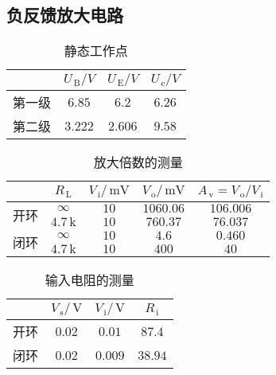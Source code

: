 \documentclass{ctexart}
\renewcommand{\rm}{\,\mathrm}
\begin{document}
    \subsection{负反馈放大电路}
    \begin{table}[htbp]
    	\centering
    	\caption{静态工作点}
    	\begin{tabular}{|l|c|c|c|}
    		\hline
    		& \multicolumn{1}{c|}{$U_{\rm{B}}/V$} & \multicolumn{1}{c|}{$U_{\rm{E}}/V$} & \multicolumn{1}{c|}{$U_{\rm{c}}/V$} \\
    		\hline
    		第一级   & $6.85$  & $6.2$   & $6.26$ \\
    		\hline
    		第二级   & $3.222$ & $2.606$ & $9.58$ \\
    		\hline
    	\end{tabular}%
    \end{table}%
    \begin{table}[htbp]
    	\centering
    	\caption{放大倍数的测量}
    	\begin{tabular}{|c|c|c|c|c|}
    		\hline
    		& \multicolumn{1}{c|}{$R_{\rm{L}}$} & \multicolumn{1}{c|}{$V_{\rm{i}}/\rm{mV}$} & \multicolumn{1}{c|}{$V_{\rm{o}}/\rm{mV}$} & \multicolumn{1}{c|}{$A_{\rm{v}}=V_{\rm{o}}/V_{\rm{i}}$} \\
    		\hline
    		\multirow{2}{*}{开环} &   $\infty$    & $10$    & $1060.06$ & $106.006$ \\
    		\cline{2-5}          & $4.7\rm{k}$  & $10$    & $760.37$ & $76.037$ \\
    		\hline
    		\multirow{2}{*}{闭环} &   $\infty$    & $10$    & $4.6$    & $0.460$ \\
    		\cline{2-5}          & $4.7\rm{k}$  & $10$    & $400$    & $40$ \\
    		\hline
    	\end{tabular}%
    \end{table}%
    \begin{table}[htbp]
    	\centering
    	\caption{输入电阻的测量}
    	\begin{tabular}{|l|c|c|c|}
    		\hline
    		& \multicolumn{1}{c|}{$V_{\rm{s}}/\rm{V}$} & \multicolumn{1}{c|}{$V_{\rm{i}}/\rm{V}$} & \multicolumn{1}{c|}{$R_{\rm{i}}$} \\
    		\hline
    		开环    & $0.02$  & $0.01$  & $87.4$ \\
    		\hline
    		闭环    & $0.02$  & $0.009$ & $38.94$ \\
    		\hline
    	\end{tabular}%
    \end{table}%
\end{document}
